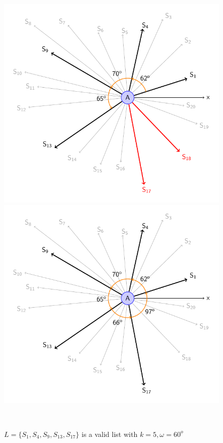 \begin{figure}[!h]
\begin{minipage}{.3\linewidth}
	\end{minipage}
	\hfill
	\begin{minipage}{.3\linewidth}
		\includegraphics[scale=.5]{setSensors_5.pdf}
	\end{minipage}
	\hfill
	\begin{minipage}{.3\linewidth}
		\includegraphics[scale=.5]{setSensors_6.pdf}
	\end{minipage}\\
	\caption{$L=\{S_1, S_4, S_9, S_{13}, S_{17}\}$ is a valid list with $k=5, \omega=60^o$}
	\label{finding}
\end{figure}


